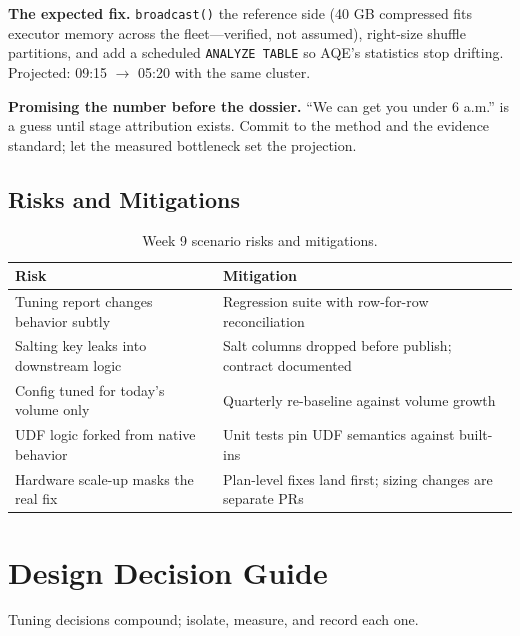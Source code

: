 \textbf{The expected fix.} \texttt{broadcast()} the reference side (40 GB compressed fits executor memory across the fleet---verified, not assumed), right-size shuffle partitions, and add a scheduled \texttt{ANALYZE TABLE} so AQE's statistics stop drifting. Projected: 09:15 $\rightarrow$ 05:20 with the same cluster.

\begin{pitfall}
\textbf{Promising the number before the dossier.} ``We can get you under 6 a.m.'' is a guess until stage attribution exists. Commit to the method and the evidence standard; let the measured bottleneck set the projection.
\end{pitfall}

\subsection{Risks and Mitigations}
\begin{table}[H]
\centering
\small
\begin{tabular}{@{}p{4.6cm}p{7.6cm}@{}}
\toprule
\textbf{Risk} & \textbf{Mitigation} \\
\midrule
Tuning report changes behavior subtly & Regression suite with row-for-row reconciliation \\
Salting key leaks into downstream logic & Salt columns dropped before publish; contract documented \\
Config tuned for today's volume only & Quarterly re-baseline against volume growth \\
UDF logic forked from native behavior & Unit tests pin UDF semantics against built-ins \\
Hardware scale-up masks the real fix & Plan-level fixes land first; sizing changes are separate PRs \\
\bottomrule
\end{tabular}
\caption{Week 9 scenario risks and mitigations.}
\label{tab:ch9-risks}
\end{table}

\section{Design Decision Guide}
%
Tuning decisions compound; isolate, measure, and record each one.

